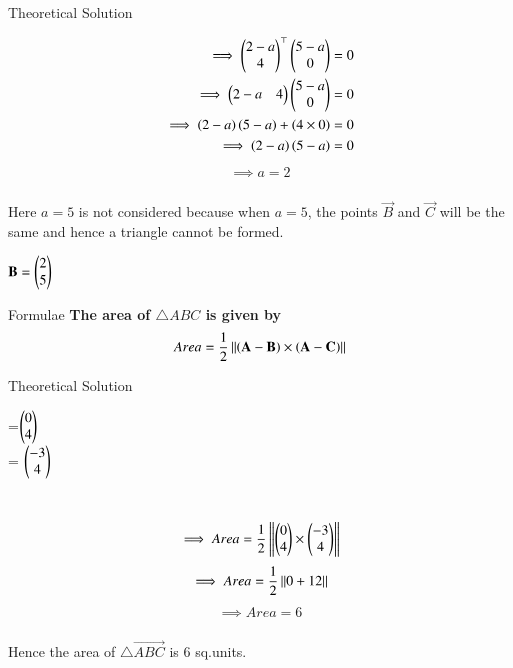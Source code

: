 \documentclass{beamer}
\begin{document}
\begin{frame}{Theoretical Solution}

\begin{align}
    \implies\begin{pmatrix}2-a\\4\end{pmatrix}^{\top}\begin{pmatrix}5-a\\0\end{pmatrix} = 0\\
    \implies\begin{pmatrix}2-a & 4\end{pmatrix}\begin{pmatrix}5-a\\0\end{pmatrix} = 0\\
    \implies \left(2-a\right)\left(5-a\right) + \left(4\times0\right) = 0\\
    \implies \left(2-a\right)\left(5-a\right) = 0
\end{align}
\begin{align}
    \implies a = 2
\end{align}
\\
Here $a = 5$ is not considered because when $a = 5$, the points $\vec{B}$ and $\vec{C}$ will be the same and hence a triangle cannot be formed.\\
\begin{center}
$\vec{B}=\begin{myvec}{2\\5}\end{myvec}$
\end{center}

\end{frame}
\begin{frame}{Formulae}
\textbf{The area of $\triangle ABC$ is given by}
		\begin{align}
			Area = \frac{1}{2}\left\lVert{\ensuremath{\left(\mathbf{A}-\mathbf{B}\right)}\times \ensuremath{\left(\mathbf{A}-\mathbf{C}\right)}}\right\rVert
		\end{align}
\end{frame}

\begin{frame}{Theoretical Solution}
\begin{center}
     =$\begin{pmatrix}0\\4\end{pmatrix}$\\
     = $\begin{pmatrix}-3\\4\end{pmatrix}$
\end{center}
\\
\begin{align}
\implies Area = \frac{1}{2}\left\lVert\begin{pmatrix}0\\4\end{pmatrix}\times \begin{pmatrix}-3\\4\end{pmatrix}\right\rVert
\end{align}
\begin{align}
\implies Area = \frac{1}{2}\left\lVert0 + 12\right\rVert
\end{align}
\begin{align}
\implies Area = 6
\end{align}\\
Hence the area of $\triangle \vec{ABC}$ is $6$ sq.units.\\

\end{frame}
\end{document}

